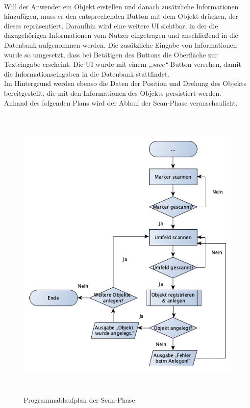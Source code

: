 \pagebreak
\\
Will der Anwender ein Objekt erstellen und danach zusätzliche Informationen hinzufügen, muss er den entsprechenden Button mit dem Objekt drücken, der 
dieses repräsentiert. Daraufhin wird eine weitere \acs{UI} sichtbar, in der die dazugehörigen Informationen vom Nutzer eingetragen und anschließend 
in die Datenbank aufgenommen werden. Die zusätzliche Eingabe von Informationen wurde so umgesetzt, dass bei Betätigen des Buttons die Oberfläche zur 
Texteingabe erscheint. Die \acs{UI} wurde mit einem \textit{„save“}-Button versehen, damit die Informationseingaben in die Datenbank stattfindet. %
\\ 
Im Hintergrund werden ebenso die Daten der Position und Drehung des 
Objekts bereitgestellt, die mit den Informationen des Objekts persistiert werden.
\\ 
\linebreak
Anhand des folgenden Plans wird der Ablauf der Scan-Phase veranschaulicht.
\begin{figure}[hbt!]
    \centering
    \includegraphics[width=15cm,height=15cm,keepaspectratio]{4Umsetzung/Bilder/scanPAP.png}
    \caption{Programmablaufplan der Scan-Phase}
    \label{pic:startmenu}
\end{figure}